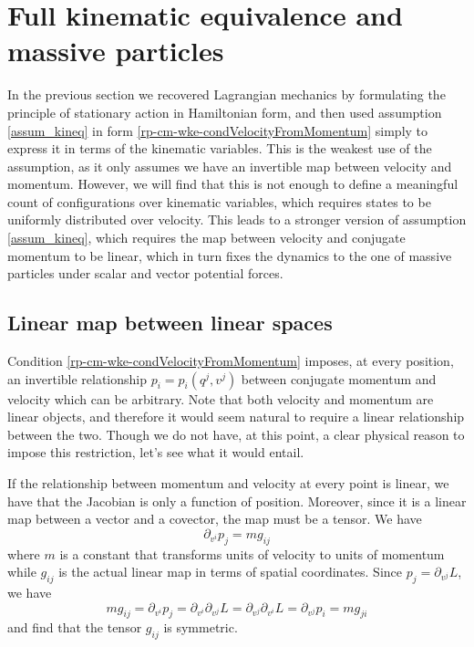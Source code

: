 \section{Full kinematic equivalence and massive particles}

In the previous section we recovered Lagrangian mechanics by formulating the principle of stationary action in Hamiltonian form, and then used assumption \ref{assum_kineq} in form \ref{rp-cm-wke-condVelocityFromMomentum} simply to express it in terms of the kinematic variables. This is the weakest use of the assumption, as it only assumes we have an invertible map between velocity and momentum. However, we will find that this is not enough to define a meaningful count of configurations over kinematic variables, which requires states to be uniformly distributed over velocity. This leads to a stronger version of assumption \ref{assum_kineq}, which requires the map between velocity and conjugate momentum to be linear, which in turn fixes the dynamics to the one of massive particles under scalar and vector potential forces.

\subsection{Linear map between linear spaces}

Condition \ref{rp-cm-wke-condVelocityFromMomentum} imposes, at every position, an invertible relationship $p_i = p_i(q^j, v^j)$ between conjugate momentum and velocity which can be arbitrary. Note that both velocity and momentum are linear objects, and therefore it would seem natural to require a linear relationship between the two. Though we do not have, at this point, a clear physical reason to impose this restriction, let's see what it would entail.

If the relationship between momentum and velocity at every point is linear, we have that the Jacobian is only a function of position. Moreover, since it is a linear map between a vector and a covector, the map must be a tensor. We have
\begin{equation}\label{rp-cm-metricTensor}
	\partial_{v^i} p_j = m g_{ij}
\end{equation}
where $m$ is a constant that transforms units of velocity to units of momentum while $g_{ij}$ is the actual linear map in terms of spatial coordinates. Since $p_j = \partial_{v^j} L$, we have
\begin{equation}
	m g_{ij} = \partial_{v^i} p_j = \partial_{v^i} \partial_{v^j} L = \partial_{v^j} \partial_{v^i} L  = \partial_{v^j} p_i =  m g_{ji}
\end{equation}
and find that the tensor $g_{ij}$ is symmetric.

